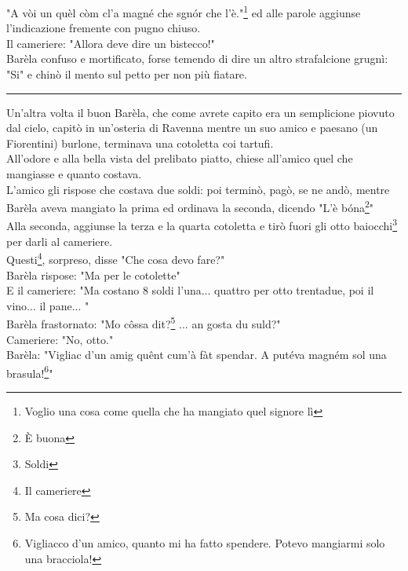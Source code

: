 "A vòi un quèl còm cl'a magné che sgnór che l'è."\footnote{Voglio una cosa come quella che ha mangiato quel signore lì} ed alle parole aggiunse l'indicazione fremente con pugno chiuso.\\
Il cameriere: "Allora deve dire un bistecco!"\\
Barèla confuso e mortificato, forse temendo di dire un altro strafalcione grugnì: "Si" e chinò il mento sul petto per non più fiatare.
\begin{center}
\rule{1.5cm}{0.4pt}
\end{center}
Un'altra volta il buon Barèla, che come avrete capito era un semplicione piovuto dal cielo, capitò in un'osteria di Ravenna mentre un suo amico e paesano (un Fiorentini) burlone, terminava una cotoletta coi tartufi.\\
All'odore e alla bella vista del prelibato piatto, chiese all'amico quel che mangiasse e quanto costava.\\
L'amico gli rispose che costava due soldi: poi terminò, pagò, se ne andò, mentre Barèla aveva mangiato la prima ed ordinava la seconda, dicendo "L'è bóna\footnote{È buona}"\\
Alla seconda, aggiunse la terza e la quarta cotoletta e tirò fuori gli otto baiocchi\footnote{Soldi} per darli al cameriere.\\
Questi\footnote{Il cameriere}, sorpreso, disse "Che cosa devo fare?"\\
Barèla rispose: "Ma per le cotolette"\\
E il cameriere: "Ma costano 8 soldi l'una... quattro per otto trentadue, poi il vino... il pane... "\\
Barèla frastornato: "Mo côssa dit?\footnote{Ma cosa dici?} ... an gosta du suld?"\\
Cameriere: "No, otto."\\
Barèla: "Vigliac d'un amig quênt cum'à fàt spendar. A putéva magném sol una brasula!\footnote{Vigliacco d'un amico, quanto mi ha fatto spendere. Potevo mangiarmi solo una bracciola!}" 